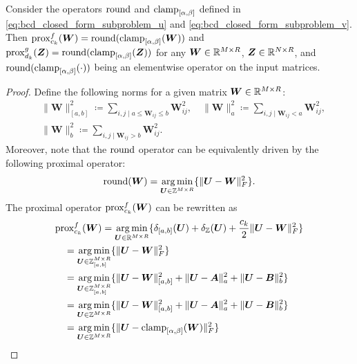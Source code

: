\begin{lemma}
    Consider the operators $\operatorname{round}$ and $\operatorname{clamp}_{[\alpha,\beta]}$ defined in \eqref{eq:bcd_closed_form_subproblem_u} and \eqref{eq:bcd_closed_form_subproblem_v}.
    Then $\operatorname{prox}^f_{c_k}(\bm W) = \operatorname{round}(\operatorname{clamp}_{[\alpha,\beta]}(\bm W))$ and $\operatorname{prox}^g_{d_k}(\bm Z) = \operatorname{round}(\operatorname{clamp}_{[\alpha,\beta]}(\bm Z))$ for any $\bm W\in \mathbb{R}^{M\times R}$, $\bm Z\in\mathbb{R}^{N\times R}$, and $\operatorname{round}(\operatorname{clamp}_{[\alpha,\beta]}(\cdot))$ being an elementwise operator on the input matrices.
\end{lemma}
\begin{proof}
    Define the following norms for a given matrix $\bm W \in \mathbb{R}^{M\times R}$:
    \begin{align*}
         & \|\bm W\|_{[a,b]}^2 \coloneqq \sum_{i,j \mid a \leq \bm W_{ij} \leq b} \bm W_{ij}^2, \quad
        \|\bm W\|_a^2 \coloneqq \sum_{i,j \mid \bm W_{ij} < a} \bm W_{ij}^2,                          \\
         & \|\bm W\|_b^2 \coloneqq \sum_{i,j \mid \bm W_{ij} > b} \bm W_{ij}^2.
    \end{align*}
    Moreover, note that the $\operatorname{round}$ operator  can be equivalently driven by the following proximal operator:
    \begin{equation}
        \operatorname{round}(\bm W) = \operatorname*{arg\,min}_{\bm U \in \mathbb{Z}^{M\times R}}\{\|\bm U - \bm W\|^2_F\}.
        \label{eq:equivalence_prox_tz}
    \end{equation}
    The proximal operator $\operatorname{prox}^f_{c_k}(\bm W)$ can be rewritten as
    \begin{align*}
        \rm{pr} & {\rm{ox}}^f_{c_k}(\bm W) = \argmin_{\bm U \in \R^{M\times R}}\{\delta_{[a,b]}(\bm U) + \delta_{\Z}(\bm U) + \frac{c_k}{2} \|\bm U - \bm W\|^2_F\} \\
                & = \argmin_{\bm U \in \Z_{[a,b]}^{M\times R}}\{\|\bm U - \bm W\|^2_F\}                                                                             \\
                & = \argmin_{\bm U \in \Z_{[a,b]}^{M\times R}}\{\|\bm U - \bm W\|^2_{[a,b]} + \|\bm U - \bm A\|^2_a + \|\bm U - \bm B\|^2_b\}                       \\
                & = \argmin_{\bm U \in \Z^{M\times R}}\{\|\bm U - \bm W\|^2_{[a,b]} + \|\bm U - \bm A\|^2_a + \|\bm U - \bm B\|^2_b\}                               \\
                & = \argmin_{\bm U \in \Z^{M\times R}}\{\|\bm U - \clamp_{[\alpha,\beta]}(\bm W)\|^2_F\}                                                            \\

\end{align*}
\end{proof}
